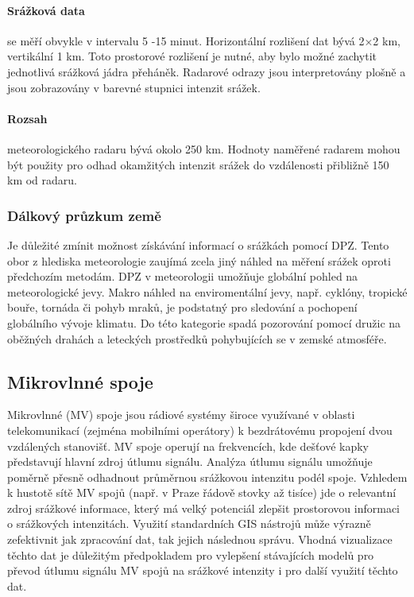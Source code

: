 \documentclass[a4paper,12pt,oneside]{report}
\begin{document}
\paragraph*{Srážková data} se měří obvykle v intervalu 5 -15 minut. Horizontální rozlišení dat bývá 2×2 km, vertikální 1 km. Toto prostorové rozlišení je nutné, aby bylo možné zachytit jednotlivá srážková jádra přeháněk. Radarové odrazy jsou interpretovány plošně a jsou zobrazovány v barevné stupnici intenzit srážek.

\paragraph*{Rozsah} meteorologického radaru bývá okolo 250 km. Hodnoty naměřené radarem mohou být použity pro odhad okamžitých intenzit srážek do vzdálenosti přibližně 150 km od radaru.\cite{kohout}

\subsubsection{Dálkový průzkum země}
Je důležité zmínit možnost získávání informací o srážkách pomocí \acs{DPZ}. Tento obor z hlediska meteorologie zaujímá zcela jiný náhled na měření srážek oproti předchozím metodám. \acs{DPZ} v meteorologii umožňuje globální pohled na meteorologické jevy. Makro náhled na enviromentální jevy, např. cyklóny, tropické bouře, tornáda či pohyb mraků, je podstatný pro sledování a pochopení globálního vývoje klimatu. Do této kategorie spadá pozorování pomocí družic na oběžných drahách a leteckých prostředků pohybujících se v zemské atmosféře. 


\subsection{Mikrovlnné spoje}
Mikrovlnné (MV) spoje jsou rádiové systémy široce využívané v oblasti telekomunikací (zejména 
mobilními operátory) k bezdrátovému propojení dvou vzdálených stanovišť. MV spoje operují na 
frekvencích, kde dešťové kapky představují hlavní zdroj útlumu signálu. Analýza útlumu signálu 
umožňuje poměrně přesně odhadnout průměrnou srážkovou intenzitu podél spoje. Vzhledem 
k hustotě sítě MV spojů (např. v Praze řádově stovky až tisíce) jde o relevantní zdroj srážkové 
informace, který má velký potenciál zlepšit prostorovou informaci o srážkových intenzitách. Využití 
standardních GIS nástrojů může výrazně zefektivnit jak zpracování dat, tak jejich následnou správu. 
Vhodná vizualizace těchto dat je důležitým předpokladem pro vylepšení stávajících modelů pro 
převod útlumu signálu MV spojů na srážkové intenzity i pro další využití těchto dat.
 
\end{document}
